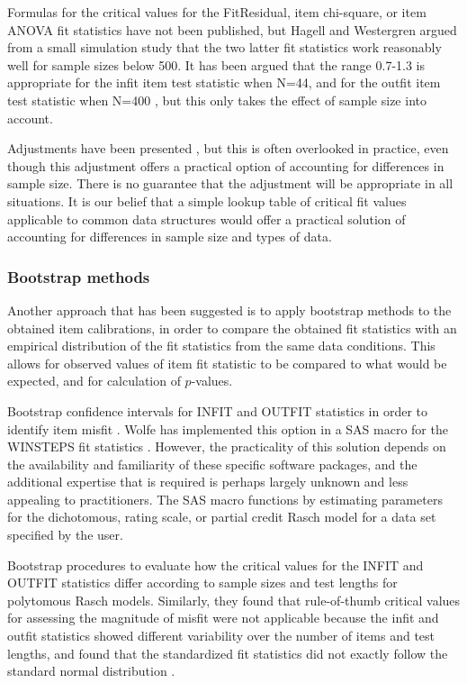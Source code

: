 \documentclass{article}
\begin{document}
Formulas for the critical values for the FitResidual, item chi-square, or item ANOVA fit statistics have not been published, but Hagell and Westergren \cite{Hagell-Westergren2016} argued from a small simulation study that the two latter fit statistics work reasonably well for sample sizes below 500. It has been argued that the range 0.7-1.3 is appropriate for the infit item test statistic when N=44, and for the outfit item test statistic when N=400 \cite{Smith-Schumacker-Bush}, but this only takes the effect of sample size into account.


Adjustments have been presented \cite{Smith-Schumacker-Bush}, but this is often overlooked in practice, even though this adjustment offers a practical option of accounting for differences in sample size. There is no guarantee that the adjustment will be appropriate in all situations. It is our belief that a simple lookup table of critical fit values applicable to common data structures would offer a practical solution of accounting for differences in sample size and types of data.




\subsubsection*{Bootstrap methods}


Another approach that has been suggested is to apply bootstrap methods \cite{efron1979,Efron1981} to the obtained item calibrations, in order to compare the obtained fit statistics with an empirical distribution of the fit statistics from the same data conditions. This allows for observed values of item fit statistic to be compared to what would be expected, and for calculation of $p$-values.

Bootstrap confidence intervals for INFIT and OUTFIT statistics in order to identify item misfit \cite{Su2007,Wolfe2013,Seol2016}. Wolfe has implemented this option in a SAS macro for the WINSTEPS fit statistics \cite{Wolfe2008}. However, the practicality of this solution depends on the availability and familiarity of these specific software packages, and the additional expertise that is required is perhaps largely unknown and less appealing to practitioners. The SAS macro functions by estimating parameters for the dichotomous, rating scale, or partial credit Rasch model for a data set specified by the user.

Bootstrap procedures to evaluate how the critical values for the INFIT and OUTFIT statistics differ according to sample sizes and test lengths for polytomous Rasch models. Similarly, they found that rule-of-thumb critical values for assessing the magnitude of misfit were not applicable because the infit and outfit statistics showed different variability over the number of items and test lengths, and found that the standardized fit statistics did not exactly follow the standard normal distribution \cite{Wolfe2008,Wolfe2013,Seol2016}.
\end{document}
